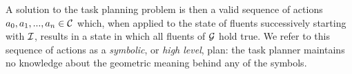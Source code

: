A solution to the task planning problem is then a valid sequence of actions
$a_{0}, a_{1}, ..., a_{n} \in \mathcal{C}$ which, when applied to the state of fluents
successively starting with $\mathcal{I}$, results in a state in which all fluents of
$\mathcal{G}$ hold true. We refer to this sequence of actions as a \emph{symbolic}, or
\emph{high level}, plan: the task planner maintains no knowledge about the geometric meaning
behind any of the symbols.







